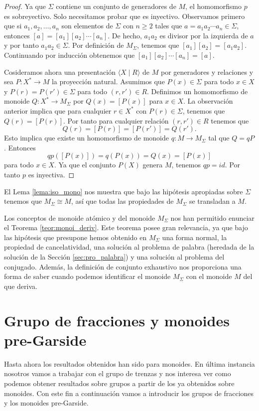 \documentclass[12pt]{book}
\theoremstyle{definition}
\begin{document}
\begin{proof} Ya que $\Sigma$ contiene un conjunto de generadores de $M$, el homomorfismo $p$ es sobreyectivo. Solo necesitamos probar que es inyectivo. Observamos primero que si $a_1,a_2,\ldots,a_n$ son elementos de $\Sigma$ con $n\geq 2$ tales que $a=a_1a_2\cdots a_n\in\Sigma$, entonces $[a]=[a_1][a_2]\cdots [a_n]$. De hecho, $a_1a_2$ es divisor por la izquierda de $a$ y por tanto $a_1a_2\in\Sigma$. Por definición de $M_\Sigma$, tenemos que $[a_1][a_2]=[a_1a_2]$. Continuando por inducción obtenemos que $[a_1][a_2]\cdots[a_n]=[a]$.

Cosideramos ahora una presentación $\langle X\mid R\rangle$ de $M$ por generadores y relaciones y sea $P:X^*\rightarrow M$ la proyección natural. Asumimos que $P(x)\in\Sigma$ para todo $x\in X$ y $P(r)=P(r')\in\Sigma$ para todo $(r,r')\in R$. Definimos un homomorfismo de monoide $Q:X^*\rightarrow M_\Sigma$ por $Q(x)=[P(x)]$ para $x\in X$. La observación anterior implica que para cualquier $r\in X^*$ con $P(r)\in\Sigma$, tenemos que $Q(r)=[P(r)]$. Por tanto para cualquier relación $(r,r')\in R$ tenemos que
$$Q(r)=[P(r)]=[P(r')]=Q(r').$$
Esto implica que existe un homomorfismo de monoide $q:M\rightarrow M_\Sigma$ tal que $Q=qP$. Entonces
$$qp([P(x)])=q(P(x))=Q(x)=[P(x)]$$
para todo $x\in X$. Ya que el conjunto $P(X)$ genera $M$, tenemos $qp=id$. Por tanto $p$ es inyectiva.
\end{proof}
El Lema \ref{lema:iso_mono} nos muestra que bajo las hipótesis apropiadas sobre $\Sigma$ tenemos que $M_\Sigma\cong M$, así que todas las propiedades de $M_\Sigma$ se transladan a $M$.

Los conceptos de monoide atómico y del monoide $M_\Sigma$ nos han permitido enunciar el Teorema \ref{teor:monoi_deriv}. Este teorema posee gran relevancia, ya que bajo las hipótesis que presupone hemos obtenido en $M_\Sigma$ una forma normal, la propiedad de cancelatividad, una solución al problema de palabra (heredada de la solución de la Sección \ref{sec:pro_palabra}) y una solución al problema del conjugado. Además, la definición de conjunto exhaustivo nos proporciona una forma de saber cuando podemos identificar el monoide $M_\Sigma$ con el monoide $M$ del que deriva.


\section{Grupo de fracciones y monoides pre-Garside}
Hasta ahora los resultados obtenidos han sido para monoides. En última instancia nosotros vamos a trabajar con el grupo de trenzas y nos interesa ver como podemos obtener resultados sobre grupos a partir de los ya obtenidos sobre monoides. Con este fin a continuación vamos a introducir los grupos de fracciones y los monoides pre-Garside.
\end{document}
